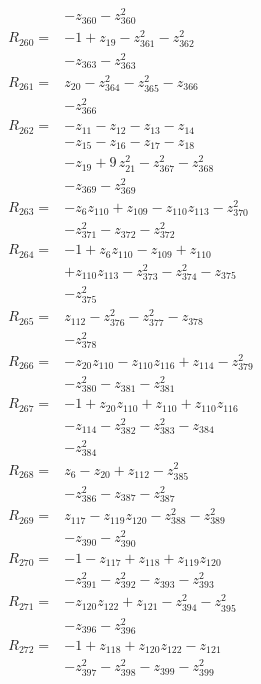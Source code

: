 \begin{align*}
&-z_{360} -z_{360}^{2}\\[2pt]
R_{260}={}&-1 +z_{19} -z_{361}^{2} -z_{362}^{2}\\
&-z_{363} -z_{363}^{2}\\[2pt]
R_{261}={}&z_{20} -z_{364}^{2} -z_{365}^{2} -z_{366}\\
&-z_{366}^{2}\\[2pt]
R_{262}={}&-z_{11} -z_{12} -z_{13} -z_{14}\\
&-z_{15} -z_{16} -z_{17} -z_{18}\\
&-z_{19} +9\,z_{21}^{2} -z_{367}^{2} -z_{368}^{2}\\
&-z_{369} -z_{369}^{2}\\[2pt]
R_{263}={}&-z_{6}z_{110} +z_{109} -z_{110}z_{113} -z_{370}^{2}\\
&-z_{371}^{2} -z_{372} -z_{372}^{2}\\[2pt]
R_{264}={}&-1 +z_{6}z_{110} -z_{109} +z_{110}\\
&+z_{110}z_{113} -z_{373}^{2} -z_{374}^{2} -z_{375}\\
&-z_{375}^{2}\\[2pt]
R_{265}={}&z_{112} -z_{376}^{2} -z_{377}^{2} -z_{378}\\
&-z_{378}^{2}\\[2pt]
R_{266}={}&-z_{20}z_{110} -z_{110}z_{116} +z_{114} -z_{379}^{2}\\
&-z_{380}^{2} -z_{381} -z_{381}^{2}\\[2pt]
R_{267}={}&-1 +z_{20}z_{110} +z_{110} +z_{110}z_{116}\\
&-z_{114} -z_{382}^{2} -z_{383}^{2} -z_{384}\\
&-z_{384}^{2}\\[2pt]
R_{268}={}&z_{6} -z_{20} +z_{112} -z_{385}^{2}\\
&-z_{386}^{2} -z_{387} -z_{387}^{2}\\[2pt]
R_{269}={}&z_{117} -z_{119}z_{120} -z_{388}^{2} -z_{389}^{2}\\
&-z_{390} -z_{390}^{2}\\[2pt]
R_{270}={}&-1 -z_{117} +z_{118} +z_{119}z_{120}\\
&-z_{391}^{2} -z_{392}^{2} -z_{393} -z_{393}^{2}\\[2pt]
R_{271}={}&-z_{120}z_{122} +z_{121} -z_{394}^{2} -z_{395}^{2}\\
&-z_{396} -z_{396}^{2}\\[2pt]
R_{272}={}&-1 +z_{118} +z_{120}z_{122} -z_{121}\\
&-z_{397}^{2} -z_{398}^{2} -z_{399} -z_{399}^{2}\\[2pt]

\end{align*}
